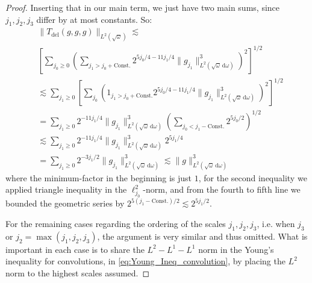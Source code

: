 \documentclass[10pt,a4paper]{amsart}
\newcommand{\dd}{{\, \mathrm d}}
\begin{document}
\begin{proof}
        Inserting that in our main term, we just have two main sums, since $j_1,j_2,j_3$ differ by at most constants. So:
        \begin{equation}
    \begin{split}
      &\|T_{\text{del}}(g,g,g)\|_{L^2(\sqrt{\omega})} 
        \lesssim \\ & 
        \left[ \sum_{j_0\geq 0}
                       \left( \sum_{j_1> j_0 + \text{Const.}}   
                        2^{5 j_0/4 - 11 j_1/4}
            \|g_{j_1}\|_{L^2(\sqrt{\omega}\dd\omega)}^3
                 \right)^2 \right]^{1/2} \\
                 & \lesssim 
                 \sum_{j_1\geq 0} 
                 \left[ \sum_{j_0} \left(1_{j_1>j_0+\text{Const.}} 2^{5 j_0/4 - 11 j_1/4}\|g_{j_1}\|_{L^2(\sqrt{\omega}\dd\omega)}^3\right)^2
                 \right]^{1/2}\\
                 & = 
                 \sum_{j_1\geq 0} 2^{- 11 j_1/4} \|g_{j_1}\|_{L^2(\sqrt{\omega}\dd\omega)}^3 
                 \left( \sum_{j_0< j_1 - \text{Const.}} 2^{5 j_0/2}  \right)^{1/2}\\
                 & \lesssim \sum_{j_1\geq 0} 2^{- 11 j_1/4} \|g_{j_1}\|_{L^2(\sqrt{\omega}\dd\omega)}^3 2^{5j_1/4}
                 \\
                 & = 
                 \sum_{j_1\geq 0} 2^{- 3 j_1/2} \|g_{j_1}\|_{L^2(\sqrt{\omega}\dd\omega)}^3  \lesssim \|g\|_{L^2(\sqrt{\omega}\dd\omega)}^3 
        \end{split}
        \end{equation}
        where the minimum-factor in the beginning is just $1$, for the second inequality we applied triangle inequality in the $\ell^2_{j_0}$-norm, and from the fourth to fifth line we bounded the geometric series by $2^{5(j_1 -\text{Const.})/2}\lesssim 2^{5 j_1/2}$.
        
For the remaining cases regarding the ordering of the scales $j_1, j_2, j_3$, i.e. when $j_3$ or $j_2 = \max(j_1,j_2, j_3)$, the argument is very similar and thus omitted. What is important in each case is to share the $L^2-L^1-L^1$ norm in the Young's inequality for convolutions, in \eqref{eq:Young_Ineq_convolution},  by placing the $L^2$ norm to the highest scales assumed. 


\end{proof}
\end{document}
